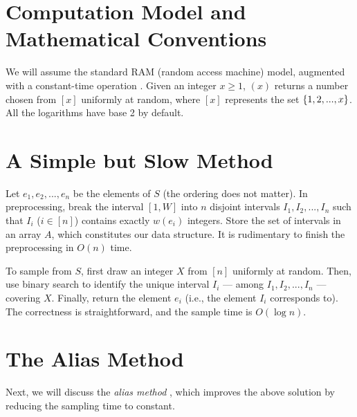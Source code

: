 \section{Computation Model and Mathematical Conventions}

We will assume the standard RAM (random access machine) model, augmented with a constant-time operation . Given an integer $x \ge 1$, $(x)$ returns a number chosen from $[x]$ uniformly at random, where $[x]$ represents the set $\{1, 2, ..., x\}$. All the logarithms have base 2 by default.




\section{A Simple but Slow Method}

Let $e_1, e_2, ..., e_n$ be the elements of $S$ (the ordering does not matter). In preprocessing, break the interval $[1, W]$ into $n$ disjoint intervals $I_1, I_2, ..., I_n$ such that $I_i$ ($i \in [n]$) contains exactly $w(e_i)$ integers. Store the set of intervals in an array $A$, which constitutes our data structure. It is rudimentary to finish the preprocessing in $O(n)$ time.

\vgap

To sample from $S$, first draw an integer $X$ from $[n]$ uniformly at random. Then, use binary search to identify the unique interval $I_i$ --- among $I_1, I_2, ..., I_n$ --- covering $X$. Finally, return the element $e_i$ (i.e., the element $I_i$ corresponds to). The correctness is straightforward, and the sample time is $O(\log n)$.

\section{The Alias Method}

Next, we will discuss the {\em alias method} \cite{w74}, which improves the above solution by reducing the sampling time to constant.

